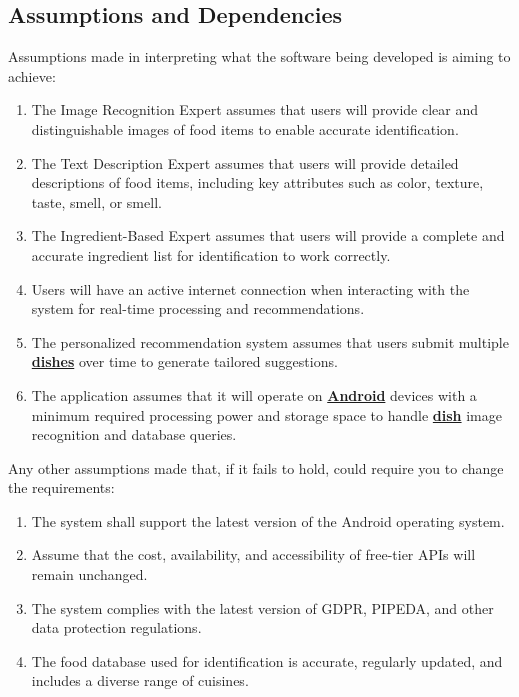 \documentclass[]{article}
\begin{document}
\subsection{Assumptions and Dependencies}
\label{sub:assumptions_and_dependencies}
Assumptions made in interpreting what the software being developed is aiming to achieve:
	\begin{enumerate}
		\item The Image Recognition Expert assumes that users will provide clear and distinguishable images of food items to enable accurate identification.
		\item The Text Description Expert assumes that users will provide detailed descriptions of food items, including key attributes such as color, texture, taste, smell, or smell.
		\item The Ingredient-Based Expert assumes that users will provide a complete and accurate ingredient list for identification to work correctly.
		\item Users will have an active internet connection when interacting with the system for real-time processing and recommendations.
		\item The personalized recommendation system assumes that users submit multiple \hyperref[Dish]{\textbf{dishes}} over time to generate tailored suggestions.
		\item The application assumes that it will operate on \hyperref[Android]{\textbf{Android}} devices with a minimum required processing power and storage space to handle \hyperref[Dish]{\textbf{dish}} image recognition and database queries.
	\end{enumerate}

Any other assumptions made that, if it fails to hold, could require you to change the requirements:
	\begin{enumerate}
		\item The system shall support the latest version of the Android operating system.
		\item Assume that the cost, availability, and accessibility of free-tier APIs will remain unchanged.
		\item The system complies with the latest version of GDPR, PIPEDA, and other data protection regulations.
		\item The food database used for identification is accurate, regularly updated, and includes a diverse range of cuisines.
	\end{enumerate}
\end{document}
